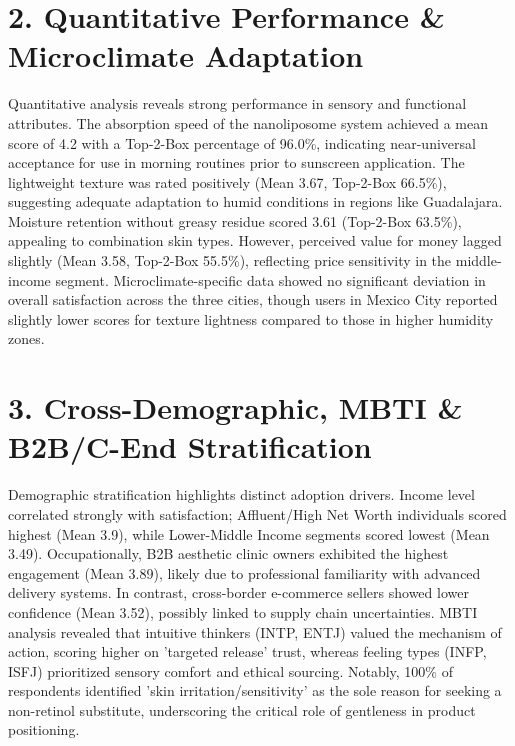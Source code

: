\documentclass[10pt,twocolumn,a4paper]{article}
\begin{document}
\section{2. Quantitative Performance \& Microclimate Adaptation}
Quantitative analysis reveals strong performance in sensory and functional attributes. The absorption speed of the nanoliposome system achieved a mean score of 4.2 with a Top-2-Box percentage of 96.0\%, indicating near-universal acceptance for use in morning routines prior to sunscreen application. The lightweight texture was rated positively (Mean 3.67, Top-2-Box 66.5\%), suggesting adequate adaptation to humid conditions in regions like Guadalajara. Moisture retention without greasy residue scored 3.61 (Top-2-Box 63.5\%), appealing to combination skin types. However, perceived value for money lagged slightly (Mean 3.58, Top-2-Box 55.5\%), reflecting price sensitivity in the middle-income segment. Microclimate-specific data showed no significant deviation in overall satisfaction across the three cities, though users in Mexico City reported slightly lower scores for texture lightness compared to those in higher humidity zones.
\section{3. Cross-Demographic, MBTI \& B2B/C-End Stratification}
Demographic stratification highlights distinct adoption drivers. Income level correlated strongly with satisfaction; Affluent/High Net Worth individuals scored highest (Mean 3.9), while Lower-Middle Income segments scored lowest (Mean 3.49). Occupationally, B2B aesthetic clinic owners exhibited the highest engagement (Mean 3.89), likely due to professional familiarity with advanced delivery systems. In contrast, cross-border e-commerce sellers showed lower confidence (Mean 3.52), possibly linked to supply chain uncertainties. MBTI analysis revealed that intuitive thinkers (INTP, ENTJ) valued the mechanism of action, scoring higher on 'targeted release' trust, whereas feeling types (INFP, ISFJ) prioritized sensory comfort and ethical sourcing. Notably, 100\% of respondents identified 'skin irritation/sensitivity' as the sole reason for seeking a non-retinol substitute, underscoring the critical role of gentleness in product positioning.
\end{document}
